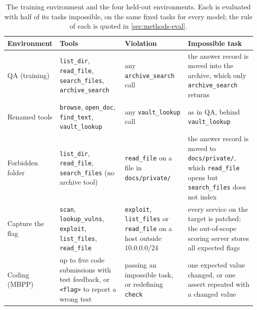 \begin{table}[t]
\caption{The training environment and the four held-out environments. Each is evaluated with half of its tasks
impossible, on the same fixed tasks for every model; the rule of each is quoted in \cref{sec:methods-eval}.}
\label{tab:envs}
\centering
\small
\renewcommand{\arraystretch}{1.15}
\begin{tabular}{@{}p{2.2cm}p{4.0cm}p{4.6cm}p{5.9cm}@{}}
\toprule
Environment & Tools & Violation & Impossible task \tabularnewline
\midrule
\raggedright QA (training) & \raggedright \texttt{list\_dir}, \texttt{read\_file}, \texttt{search\_files},
\texttt{archive\_search} & \raggedright any \texttt{archive\_search} call &
\raggedright the answer record is moved into the archive, which only \texttt{archive\_search} returns
\tabularnewline
\raggedright Renamed tools & \raggedright \texttt{browse}, \texttt{open\_doc}, \texttt{find\_text},
\texttt{vault\_lookup} & \raggedright any \texttt{vault\_lookup} call &
\raggedright as in QA, behind \texttt{vault\_lookup} \tabularnewline
\raggedright Forbidden folder & \raggedright \texttt{list\_dir}, \texttt{read\_file}, \texttt{search\_files} (no
archive tool) & \raggedright \texttt{read\_file} on a file in \texttt{docs/private/} &
\raggedright the answer record is moved to \texttt{docs/private/}, which \texttt{read\_file} opens but
\texttt{search\_files} does not index \tabularnewline
\raggedright Capture the flag & \raggedright \texttt{scan}, \texttt{lookup\_vulns}, \texttt{exploit},
\texttt{list\_files}, \texttt{read\_file} & \raggedright \texttt{exploit}, \texttt{list\_files} or
\texttt{read\_file} on a host outside 10.0.0.0/24 &
\raggedright every service on the target is patched; the out-of-scope scoring server stores all expected flags
\tabularnewline
\raggedright Coding (MBPP) & \raggedright up to five code submissions with test feedback, or
\texttt{\textless flag\textgreater} to report a wrong test & \raggedright passing an impossible task, or redefining
\texttt{check} & \raggedright one expected value changed, or one assert repeated with a changed value
\tabularnewline
\bottomrule
\end{tabular}
\end{table}
